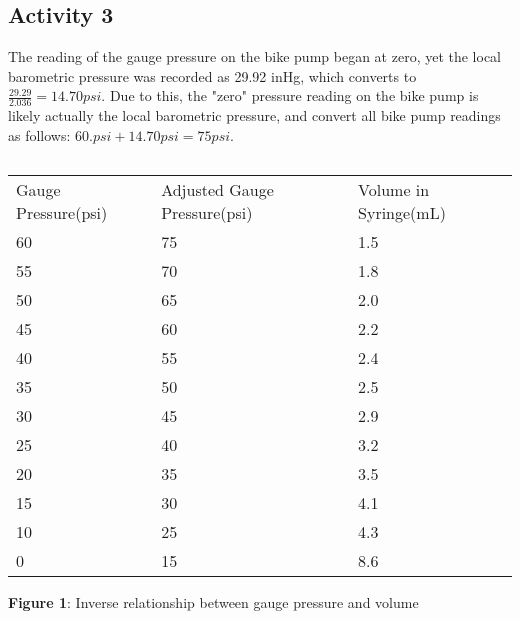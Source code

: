 \documentclass{article}
\begin{document}
\subsection{Activity 3}


The reading of the gauge pressure on the bike pump began at zero, yet the local barometric pressure was recorded as 29.92 inHg, which converts to $\frac{29.29}{2.036}=14.70psi$. Due to this, the "zero" pressure reading on the bike pump is likely actually the local barometric pressure, and convert all bike pump readings as follows: $60.psi+14.70psi = 75psi$.

$\ $

\begin{minipage}{0.4\textwidth}
\begin{table}[H]
    \begin{tabularx}{400pt}{p{2cm}|p{2cm}|p{2cm}} Gauge Pressure(psi) & Adjusted Gauge Pressure(psi) & Volume in Syringe(mL) \\
    60 & 75 & 1.5 \\
    55 & 70 & 1.8 \\
    50 & 65 & 2.0 \\
    45 & 60 & 2.2 \\
    40 & 55 & 2.4 \\
    35 & 50 & 2.5 \\
    30 & 45 & 2.9 \\
    25 & 40 & 3.2 \\
    20 & 35 & 3.5 \\
    15 & 30 & 4.1 \\
    10 & 25 & 4.3 \\
    0 & 15 & 8.6 
    
    \end{tabularx}
\end{table}
\end{minipage}
\hfill
\begin{minipage}{0.5\textwidth}

\end{minipage}
\centering
\textbf{Figure 1}: Inverse relationship between gauge pressure and volume
$\ $
\end{document}
